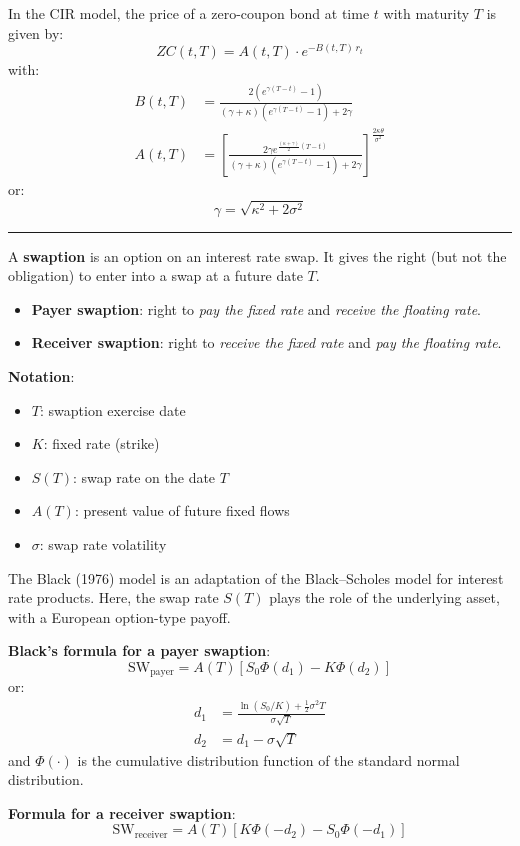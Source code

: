\begin{f}
In the CIR model, the price of a zero-coupon bond at time \(t\) with maturity \(T\) is given by:
\[
ZC(t, T) = A(t, T) \cdot e^{-B(t, T)\, r_t}
\]
with:
\[
\begin{aligned}
	B(t, T) &= \frac{2 (e^{\gamma (T - t)} - 1)}{(\gamma + \kappa)(e^{\gamma (T - t)} - 1) + 2\gamma} \\
	A(t, T) &= \left[ \frac{2\gamma e^{\frac{(\kappa + \gamma)}{2}(T - t)}}{(\gamma + \kappa)(e^{\gamma (T - t)} - 1) + 2\gamma} \right]^{\frac{2\kappa\theta}{\sigma^2}}
\end{aligned}
\]
or:
\[
\gamma = \sqrt{\kappa^2 + 2\sigma^2}
\]

\end{f}
\hrule

\begin{f}

A \textbf{swaption} is an option on an interest rate swap. It gives the right (but not the obligation) to enter into a swap at a future date \(T\).

\begin{itemize}[nosep]
	\item \textbf{Payer swaption}: right to \emph{pay the fixed rate} and \emph{receive the floating rate}.
	\item \textbf{Receiver swaption}: right to \emph{receive the fixed rate} and \emph{pay the floating rate}.
\end{itemize}

\textbf{Notation}:
\begin{itemize}[nosep]
	\item \(T\): swaption exercise date
	\item \(K\): fixed rate (strike)
	\item \(S(T)\): swap rate on the date \(T\)
	\item \(A(T)\): present value of future fixed flows
	\item \(\sigma\): swap rate volatility
\end{itemize}

The Black (1976) model is an adaptation of the Black–Scholes model for interest rate products. Here, the swap rate \(S(T)\) plays the role of the underlying asset, with a European option-type payoff.

\textbf{Black's formula for a payer swaption}:
\[
\text{SW}_{\text{payer}} = A(T) \left[ S_0 \Phi(d_1) - K \Phi(d_2) \right]
\]
or:
\[
\begin{aligned}
	d_1 &= \frac{\ln(S_0 / K) + \frac{1}{2} \sigma^2 T}{\sigma \sqrt{T}} \\
	d_2 &= d_1 - \sigma \sqrt{T}
\end{aligned}
\]
and \(\Phi(\cdot)\) is the cumulative distribution function of the standard normal distribution.

\textbf{Formula for a receiver swaption}:
\[
\text{SW}_{\text{receiver}} = A(T) \left[ K \Phi(-d_2) - S_0 \Phi(-d_1) \right]
\]

\end{f}

